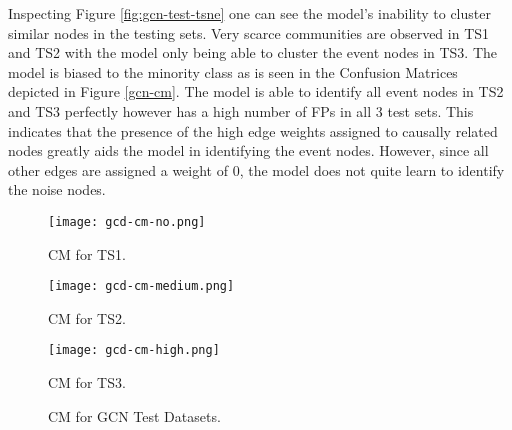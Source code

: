 Inspecting Figure \ref{fig:gcn-test-tsne} one can see the model's
inability to cluster similar nodes in the testing sets. Very scarce
communities are observed in TS1 and TS2 with the model only being able
to cluster the event nodes in TS3. The model is biased to the minority
class as is seen in the Confusion Matrices depicted in Figure
\ref{gcn-cm}. The model is able to identify all event nodes in TS2 and
TS3 perfectly however has a high number of FPs in all 3 test sets.
This indicates that the presence of the high edge weights assigned to
causally related nodes greatly aids the model in identifying the event
nodes. However, since all other edges are assigned a weight of 0, the
model does not quite learn to identify the noise nodes.

\begin{figure}[htb]
  \centering
  \begin{minipage}{0.32\textwidth}
    \centering
    \texttt{[image: gcd-cm-no.png]}
    \caption{CM for TS1.}
  \end{minipage}
  \begin{minipage}{0.32\textwidth}
    \centering
    \texttt{[image: gcd-cm-medium.png]}
    \caption{CM for TS2.}
  \end{minipage}
  \begin{minipage}{0.32\textwidth}
    \centering
    \texttt{[image: gcd-cm-high.png]}
    \caption{CM for TS3.}
  \end{minipage}
  \caption{CM for GCN Test Datasets.}
  \label{fig:gcn-cm}
\end{figure}

